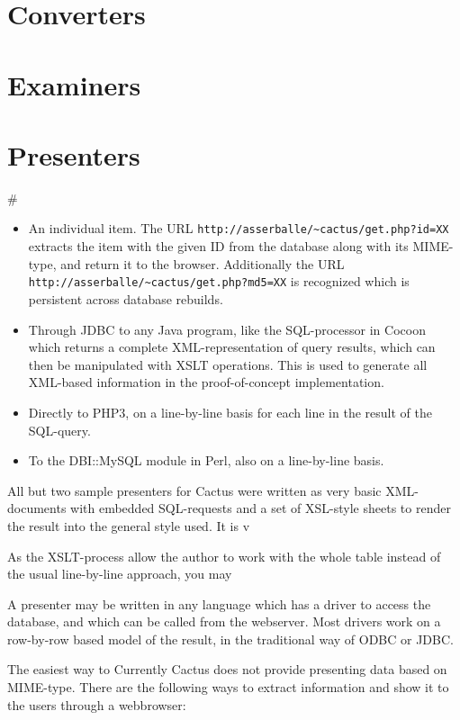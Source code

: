 \section{Converters}

\section{Examiners}

\section{Presenters}

#
\begin{itemize}
\item An individual item.  The URL
\texttt{http://asserballe/\~{}cactus/get.php?id=XX} extracts the item
with the given ID from the database along with its MIME-type, and
return it to the browser.  Additionally the URL
\texttt{http://asserballe/\~{}cactus/get.php?md5=XX} is recognized
which is persistent across database rebuilds.

\item Through JDBC to any Java program, like the SQL-processor in
Cocoon which returns a complete XML-representation of query results,
which can then be manipulated with XSLT operations.  This is used to
generate all XML-based information in the proof-of-concept
implementation.

\item Directly to PHP3, on a line-by-line basis for each line in the
  result of the SQL-query.

\item To the DBI::MySQL module in Perl, also on a
  line-by-line basis.
\end{itemize}


All but two sample presenters for Cactus were written as very basic
XML-documents with embedded SQL-requests and a set of XSL-style sheets
to render the result into the general style used.  It is v

As the XSLT-process
allow the author to work with the whole table instead of the usual
line-by-line approach, you may




A presenter may be written in any language
which has a driver to access the database, and which can be called
from the webserver.   Most drivers work on a row-by-row based model of
the result, in the traditional way of ODBC or JDBC.

The easiest way to 
Currently Cactus does not provide presenting data based on
MIME-type.  There are the following ways to extract
information and show it to the users through a webbrowser:


